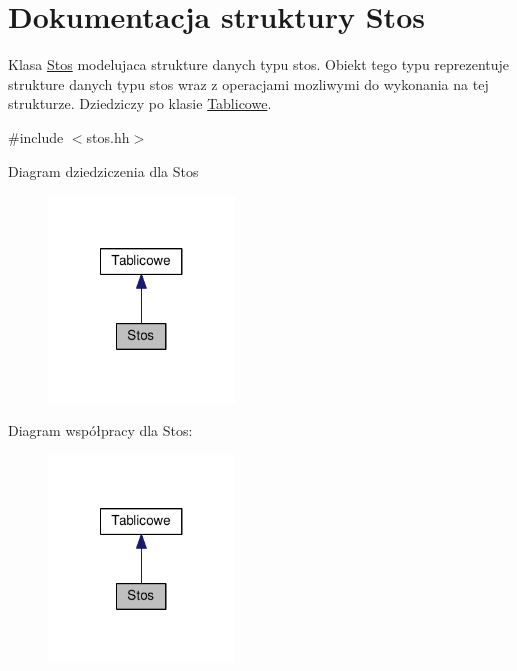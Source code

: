 \hypertarget{struct_stos}{\section{Dokumentacja struktury Stos}
\label{struct_stos}
}


Klasa \hyperlink{struct_stos}{Stos} modelujaca strukture danych typu stos. Obiekt tego typu reprezentuje strukture danych typu stos wraz z operacjami mozliwymi do wykonania na tej strukturze. Dziedziczy po klasie \hyperlink{class_tablicowe}{Tablicowe}.  




{\ttfamily \#include $<$stos.\-hh$>$}



Diagram dziedziczenia dla Stos
\nopagebreak
\begin{figure}[H]
\begin{center}
\leavevmode
\includegraphics[width=140pt]{struct_stos__inherit__graph}
\end{center}
\end{figure}


Diagram współpracy dla Stos\-:
\nopagebreak
\begin{figure}[H]
\begin{center}
\leavevmode
\includegraphics[width=140pt]{struct_stos__coll__graph}
\end{center}
\end{figure}
